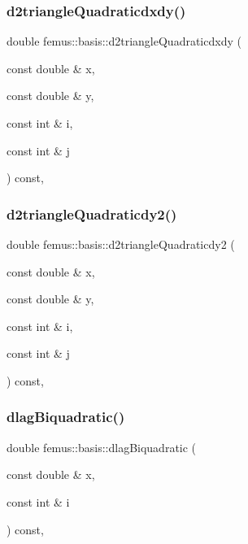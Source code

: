 \subsubsection{\texorpdfstring{d2triangle\+Quadraticdxdy()}{d2triangleQuadraticdxdy()}}
{\footnotesize\ttfamily double femus\+::basis\+::d2triangle\+Quadraticdxdy (\begin{DoxyParamCaption}\item[{const double \&}]{x,  }\item[{const double \&}]{y,  }\item[{const int \&}]{i,  }\item[{const int \&}]{j }\end{DoxyParamCaption}) const\hspace{0.3cm}{\ttfamily [inline]}, {\ttfamily [protected]}}

\mbox{\label{classfemus_1_1basis_ab4432bf9996b939143fe7a013a397094}} 
\subsubsection{\texorpdfstring{d2triangle\+Quadraticdy2()}{d2triangleQuadraticdy2()}}
{\footnotesize\ttfamily double femus\+::basis\+::d2triangle\+Quadraticdy2 (\begin{DoxyParamCaption}\item[{const double \&}]{x,  }\item[{const double \&}]{y,  }\item[{const int \&}]{i,  }\item[{const int \&}]{j }\end{DoxyParamCaption}) const\hspace{0.3cm}{\ttfamily [inline]}, {\ttfamily [protected]}}

\mbox{\label{classfemus_1_1basis_a52c019c4c820beb94e20e71b31868384}} 
\subsubsection{\texorpdfstring{dlag\+Biquadratic()}{dlagBiquadratic()}}
{\footnotesize\ttfamily double femus\+::basis\+::dlag\+Biquadratic (\begin{DoxyParamCaption}\item[{const double \&}]{x,  }\item[{const int \&}]{i }\end{DoxyParamCaption}) const\hspace{0.3cm}{\ttfamily [inline]}, {\ttfamily [protected]}}

